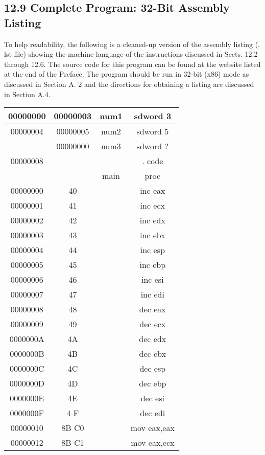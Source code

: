 \documentclass[10pt]{article}
\begin{document}
\subsection*{12.9 Complete Program: 32-Bit Assembly Listing}
To help readability, the following is a cleaned-up version of the assembly listing (. lst file) showing the machine language of the instructions discussed in Sects. 12.2 through 12.6. The source code for this program can be found at the website listed at the end of the Preface. The program should be run in 32-bit (x86) mode as discussed in Section A. 2 and the directions for obtaining a listing are discussed in Section A.4.

\begin{center}
\begin{tabular}{|c|c|c|c|}
\hline
00000000 & 00000003 & num1 & sdword 3 \\
\hline
00000004 & 00000005 & num2 & sdword 5 \\
\hline
\multirow[t]{3}{*}{00000008} & 00000000 & num3 & sdword ? \\
\hline
 &  &  & . code \\
\hline
 &  & main & proc \\
\hline
00000000 & 40 &  & inc eax \\
\hline
00000001 & 41 &  & inc ecx \\
\hline
00000002 & 42 &  & inc edx \\
\hline
00000003 & 43 &  & inc ebx \\
\hline
00000004 & 44 &  & inc esp \\
\hline
00000005 & 45 &  & inc ebp \\
\hline
00000006 & 46 &  & inc esi \\
\hline
00000007 & 47 &  & inc edi \\
\hline
00000008 & 48 &  & dec eax \\
\hline
00000009 & 49 &  & dec ecx \\
\hline
0000000A & 4A &  & dec edx \\
\hline
0000000B & 4B &  & dec ebx \\
\hline
0000000C & 4C &  & dec esp \\
\hline
0000000D & 4D &  & dec ebp \\
\hline
0000000E & 4E &  & dec esi \\
\hline
0000000F & 4 F &  & dec edi \\
\hline
00000010 & 8B C0 &  & mov eax,eax \\
\hline
00000012 & 8B C1 &  & mov eax,ecx \\

\end{tabular}
\end{center}
\end{document}
